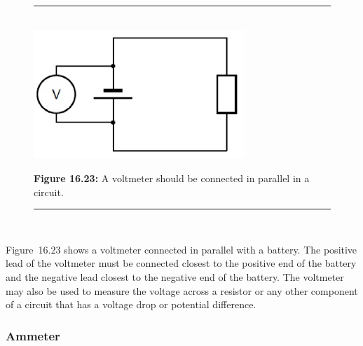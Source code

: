 	\begin{figure}[H] %
    \begin{center}
    \rule[.1in]{\figurerulewidth}{.005in} \\
        \label{m38773*uid73!!!underscore!!!media}\label{m38773*uid73!!!underscore!!!printimage}\includegraphics[width=300px]{col11305.imgs/m38773_PG10C9_034.png} %
        
      \vspace{2pt}
    \vspace{\rubberspace}\par \begin{cnxcaption}
	  \small \textbf{Figure 16.23: }A voltmeter should be connected in parallel in a circuit.
	\end{cnxcaption}
      
    \vspace{.1in}
    \rule[.1in]{\figurerulewidth}{.005in} \\
        
    \end{center}

 \end{figure}   

    \addtocounter{footnote}{-0}
    
        \label{m38773*id67678}Figure~16.23 shows a voltmeter connected
in parallel with a battery. The positive lead of the voltmeter must be connected closest to the positive end of the battery and the negative lead closest to the negative end of the battery. The voltmeter may also be used to measure the
voltage across a resistor or any other component of a circuit that has a voltage drop or potential difference.\par 
      
      \label{m38773*uid74}
            \subsubsection{ Ammeter}
            \nopagebreak
            
